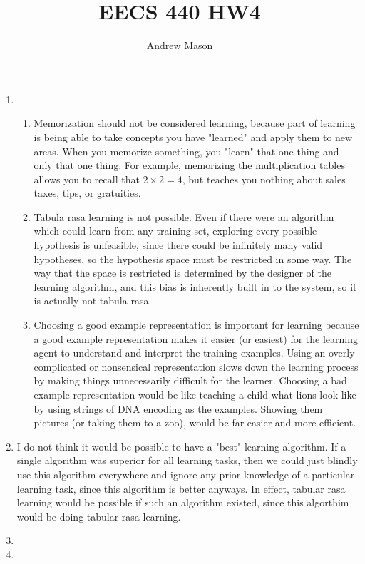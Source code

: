 \documentclass[12pt]{article}
\title{EECS 440 HW4}
\author{Andrew Mason}
\begin{document}
\maketitle

\begin{enumerate}
  \item
    \begin{enumerate}
      \item
        Memorization should not be considered learning, because part of
        learning is being able to take concepts you have "learned" and apply
        them to new areas. When you memorize something, you "learn" that one
        thing and only that one thing. For example, memorizing the
        multiplication tables allows you to recall that $2\times 2=4$, but
        teaches you nothing about sales taxes, tips, or gratuities.
      \item
        Tabula rasa learning is not possible. Even if there were an algorithm
        which could learn from any training set, exploring every possible
        hypothesis is unfeasible, since there could be infinitely many valid
        hypotheses, so the hypothesis space must be restricted in some way. The
        way that the space is restricted is determined by the designer of the
        learning algorithm, and this bias is inherently built in to the system,
        so it is actually not tabula rasa.
      \item
        Choosing a good example representation is important for learning
        because a good example representation makes it easier (or easiest) for
        the learning agent to understand and interpret the training examples.
        Using an overly-complicated or nonsensical representation slows down
        the learning process by making things unnecessarily difficult for the
        learner. Choosing a bad example representation would be like teaching
        a child what lions look like by using strings of DNA encoding as the
        examples. Showing them pictures (or taking them to a zoo), would be far
        easier and more efficient.
    \end{enumerate}
  \item
    I do not think it would be possible to have a "best" learning algorithm. If
    a single algorithm was superior for all learning tasks, then we could just
    blindly use this algorithm everywhere and ignore any prior knowledge of a
    particular learning task, since this algorithm is better anyways. In
    effect, tabular rasa learning would be possible if such an algorithm
    existed, since this algorthim would be doing tabular rasa learning.
  \item
  \item
\end{enumerate}
\end{document}
